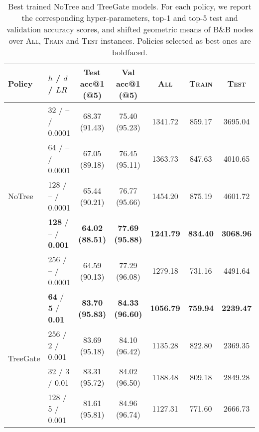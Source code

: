 \documentclass[letterpaper]{article} %
\begin{document}
\begin{table*}[t]
    \caption{Best trained NoTree and TreeGate models. For each policy, we report the corresponding hyper-parameters, top-1 and top-5 test and validation accuracy scores, and shifted geometric means of B\&B nodes over \textsc{All}, \textsc{Train} and \textsc{Test} instances.
    Policies selected as best ones are boldfaced.}
    \label{tab:best_policies}
    \centering
    \begin{footnotesize}
    \begin{tabular}{llccccc}
\toprule
          Policy & $h$ / $d$ / $\mathit{LR}$ & Test acc@1 (@5) & Val acc@1 (@5) &  \textsc{All} & \textsc{Train} & \textsc{Test}  \\
\toprule
    \multirow{5}{*}{NoTree} & 32 / -- / 0.0001 & 68.37 (91.43) & 75.40 (95.23) & 1341.72 & 859.17 & 3695.04 \\
     & 64 / -- / 0.0001 & 67.05 (89.18) & 76.45 (95.11) &  1363.73 & 847.63 & 4010.65 \\
     & 128 / -- / 0.0001 & 65.44 (90.21) & 76.77 (95.66) &  1454.20 & 875.19 & 4601.72 \\
     & \textbf{128} / -- / \textbf{0.001} & \textbf{64.02 (88.51)} & \textbf{77.69 (95.88)} & \textbf{1241.79} & \textbf{834.40} & \textbf{3068.96} \\
     & 256 / -- / 0.0001 & 64.59 (90.13) & 77.29 (96.08) & 1279.18 & 731.16 & 4491.64 \\
    \midrule
    \multirow{4}{*}{TreeGate} & \textbf{64} / \textbf{5} / \textbf{0.01} & \textbf{83.70 (95.83)} & \textbf{84.33 (96.60)} & \textbf{1056.79} & \textbf{759.94} & \textbf{2239.47} \\
     & 256 / 2 / 0.001 & 83.69 (95.18) & 84.10 (96.42) & 1135.28 & 822.80  & 2369.35 \\
     & 32 / 3 / 0.01 & 83.31 (95.72) & 84.02 (96.50) & 1188.48 & 809.18  & 2849.28 \\
     & 128 / 5 / 0.001 & 81.61 (95.81) & 84.96 (96.74) & 1127.31 & 771.60 & 2666.73 \\
\bottomrule
\end{tabular}
\end{footnotesize}
\end{table*}
\end{document}
